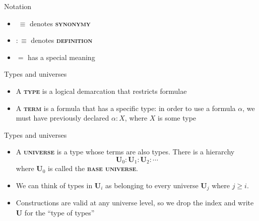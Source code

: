 \documentclass{beamer}
\newcommand{\defn}[1]{{\scshape\bfseries\color{MPBemph}#1}}
\newcommand{\eql}{\mathbin{:\equiv}}
\newcommand{\U}{\textbf{U}}
\newcommand{\1}{\textbf{1}}
\newcommand{\0}{\mathbf{0}}
\newcommand{\2}{\textbf{2}}
\begin{document}
\begin{frame}{Notation}
\begin{itemize}[<+- >]
	\item \( \;\equiv \) denotes \defn{synonymy}
	\item \( \eql \) denotes \defn{definition}
	\item \( = \) has a special meaning
\end{itemize} \end{frame}
\begin{frame}{Types and universes}
\begin{itemize}[<+- >]
	\item A \defn{type} is a logical demarcation that restricts formulae
	\item A \defn{term} is a formula that has a specific type: in order to use a formula \( \alpha \), we must have previously declared \( \alpha : X \), where \( X \) is some type
\end{itemize} \end{frame}
\begin{frame}{Types and universes}
\begin{itemize}[<+- >]
	\item A \defn{universe} is a type whose terms are also types. There is a hierarchy
	\[ \U_{0} : \U_{1} : \U_{2} : \dotsb \]
	where \( \U_{0} \) is called the \defn{base universe}.
	\item We can think of types in \( \U_{i} \) as belonging to every universe \( \U_{j} \) where \( j \geq i \).
	\item Constructions are valid at any universe level, so we drop the index and write \( \U \) for the ``type of types''
\end{itemize}
\end{frame}
\end{document}
